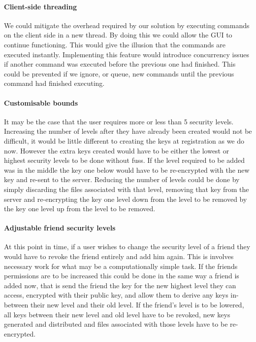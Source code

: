 \documentclass[12pt, titlepage]{article}
\begin{document}
\paragraph*{Client-side threading} We could mitigate the overhead required by our solution by executing commands on the client side in a new thread. By doing this we could allow the GUI to continue functioning. This would give the illusion that the commands are executed instantly. Implementing this feature would introduce concurrency issues if another command was executed before the previous one had finished. This could be prevented if we ignore, or queue, new commands until the previous command had finished executing. 
\paragraph*{Customisable bounds} It may be the case that the user requires more or less than 5 security levels. Increasing the number of levels after they have already been created would not be difficult, it would be little different to creating the keys at registration as we do now. However the extra keys created would have to be either the lowest or highest security levels to be done without fuss. If the level required to be added was in the middle the key one below would have to be re-encrypted with the new key and re-sent to the server. Reducing the number of levels could be done by simply discarding the files associated with that level, removing that key from the server and re-encrypting the key one level down from the level to be removed by the key one level up from the level to be removed.
\paragraph*{Adjustable friend security levels} At this point in time, if a user wishes to change the security level of a friend they would have to revoke the friend entirely and add him again. This is involves necessary work for what may be a computationally simple task. If the friends permissions are to be increased this could be done in the same way a friend is added now, that is send the friend the key for the new highest level they can access, encrypted with their public key, and allow them to derive any keys in-between their new level and their old level. If the friend's level is to be lowered, all keys between their new level and old level have to be revoked, new keys generated and distributed and files associated with those levels have to be re-encrypted.
\end{document}
